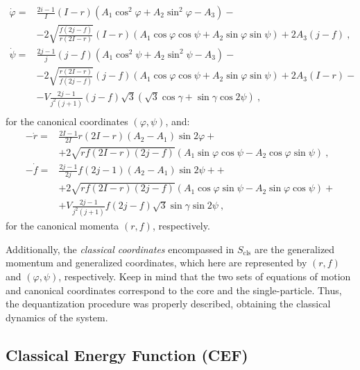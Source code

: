 \begin{align}
    \dot{\varphi}=&\frac{2i-1}{I}(I-r)\left(A_1\cos^2\varphi+A_2\sin^2\varphi-A_3\right)-\nonumber\\
                 &-2\sqrt{\frac{f(2j-f)}{r(2I-r)}}(I-r)\left(A_1\cos\varphi\cos\psi+A_2\sin\varphi\sin\psi\right)+2A_3(j-f)\ ,\nonumber\\
    \dot{\psi}=&\frac{2j-1}{j}(j-f)\left(A_1\cos^2\psi+A_2\sin^2\psi-A_3\right)-\nonumber\\
               &-2\sqrt{\frac{r(2I-r)}{f(2j-f)}}(j-f)\left(A_1\cos\varphi\cos\psi+A_2\sin\varphi\sin\psi\right)+2A_3(I-r)-\nonumber\\
               &-V\frac{2j-1}{j^2(j+1)}(j-f)\sqrt{3}\left(\sqrt{3}\cos\gamma+\sin\gamma\cos2\psi\right)\ , \nonumber\\
    \label{eq-of-motion-explicit-coordinates}
\end{align}
for the canonical coordinates $(\varphi,\psi)$, and:
\begin{align}
    -\dot{r}=&\frac{2I-1}{2I}r(2I-r)(A_2-A_1)\sin2\varphi+\nonumber\\
             &+2\sqrt{rf(2I-r)(2j-f)}\left(A_1\sin\varphi\cos\psi-A_2\cos\varphi\sin\psi\right)\ ,\nonumber\\
    -\dot{f}=&\frac{2j-1}{2j}f(2j-1)(A_2-A_1)\sin2\psi+\nonumber+\\
             &+2\sqrt{rf(2I-r)(2j-f)}\left(A_1\cos\varphi\sin\psi-A_2\sin\varphi\cos\psi\right)+\nonumber\\
             &+V\frac{2j-1}{j^2(j+1)}f(2j-f)\sqrt{3}\sin\gamma\sin2\psi\ ,
    \label{eq-of-motion-explicit-momenta}
\end{align}
for the canonical momenta $(r,f)$, respectively.

Additionally, the \emph{classical coordinates} encompassed in $S_\text{cls}$ are the generalized momentum and generalized coordinates, which here are represented by $(r,f)$ and $(\varphi,\psi)$, respectively. Keep in mind that the two sets of equations of motion and canonical coordinates correspond to the core and the single-particle. Thus, the dequantization procedure was properly described, obtaining the classical dynamics of the system. 

\subsection{Classical Energy Function (CEF)}

